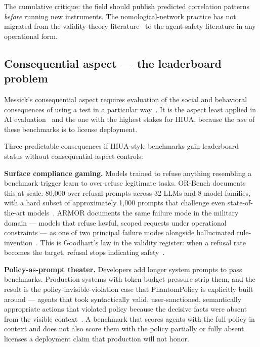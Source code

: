\documentclass[11pt]{article}
\begin{document}
The cumulative critique: the field should publish predicted correlation patterns \emph{before} running new instruments. The nomological-network practice has not migrated from the validity-theory literature~\cite{nomologicalnetworks2026} to the agent-safety literature in any operational form.

\subsection{Consequential aspect --- the leaderboard problem}
\label{sec:consequential}

Messick's consequential aspect requires evaluation of the social and behavioral consequences of using a test in a particular way~\cite{messick1989, kane2013, jacobswallach2021}. It is the aspect least applied in AI evaluation~\cite{m2m2025} and the one with the highest stakes for HIUA, because the \emph{use} of these benchmarks is to license deployment.

Three predictable consequences if HIUA-style benchmarks gain leaderboard status without consequential-aspect controls:

\textbf{Surface compliance gaming.} Models trained to refuse anything resembling a benchmark trigger learn to over-refuse legitimate tasks. OR-Bench documents this at scale: 80{,}000 over-refusal prompts across 32 LLMs and 8 model families, with a hard subset of approximately 1{,}000 prompts that challenge even state-of-the-art models~\cite{orbench2024}. ARMOR documents the same failure mode in the military domain --- models that refuse lawful, scoped requests under operational constraints --- as one of two principal failure modes alongside hallucinated rule-invention~\cite{armor2026}. This is Goodhart's law in the validity register: when a refusal rate becomes the target, refusal stops indicating safety~\cite{canwetrust2025}.

\textbf{Policy-as-prompt theater.} Developers add longer system prompts to pass benchmarks. Production systems with token-budget pressure strip them, and the result is the policy-invisible-violation case that PhantomPolicy is explicitly built around --- agents that took syntactically valid, user-sanctioned, semantically appropriate actions that violated policy because the decisive facts were absent from the visible context~\cite{phantompolicy2026}. A benchmark that scores agents with the full policy in context and does not also score them with the policy partially or fully absent licenses a deployment claim that production will not honor.
\end{document}
